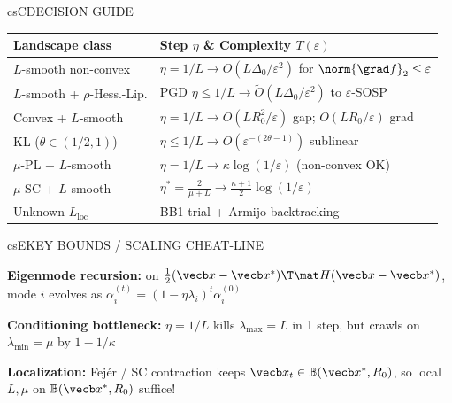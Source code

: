 \documentclass[../../../../master.tex]{subfiles}
\begin{document}
\begin{cscolumns}
\begin{cscard}{csC}{DECISION GUIDE}
  \renewcommand{\arraystretch}{1.12}\footnotesize
  \begin{tabular}{@{}>{\raggedright\arraybackslash}p{3.1cm}>{\raggedright\arraybackslash}p{4.6cm}@{}}
    \textbf{Landscape class} & \textbf{Step $\eta$ \& Complexity $T(\varepsilon)$}\\ \hline
    $L$-smooth non-convex & $\eta=1/L \to O(L\Delta_0/\varepsilon^2)$ for $\norm{\grad f}_2\le\varepsilon$\\
    $L$-smooth + $\rho$-Hess.-Lip. & PGD $\eta\le 1/L \to \tilde O(L\Delta_0/\varepsilon^2)$ to $\varepsilon$-SOSP\\
    Convex + $L$-smooth & $\eta=1/L \to O(LR_0^2/\varepsilon)$ gap; $O(LR_0/\varepsilon)$ grad\\
    KL ($\theta\in(1/2,1)$) & $\eta\le 1/L \to O(\varepsilon^{-(2\theta-1)})$ sublinear\\
    $\mu$-PL + $L$-smooth & $\eta=1/L \to \kappa\log(1/\varepsilon)$ (non-convex OK)\\
    $\mu$-SC + $L$-smooth & $\eta^*=\frac{2}{\mu+L} \to \frac{\kappa+1}{2}\log(1/\varepsilon)$\\
    Unknown $L_{\mathrm{loc}}$ & BB1 trial + Armijo backtracking\\
  \end{tabular}
\end{cscard}

\begin{cscard}{csE}{KEY BOUNDS / SCALING CHEAT-LINE}
  \footnotesize
  \begin{csbul}
    \item \textbf{Eigenmode recursion:} on $\frac{1}{2}(\vecb x-\vecb x^*)\T\mat H(\vecb x-\vecb x^*)$, mode $i$ evolves as $\alpha_i^{(t)}=(1-\eta\lambda_i)^t\alpha_i^{(0)}$
    \item \textbf{Conditioning bottleneck:} $\eta=1/L$ kills $\lambda_{\max}=L$ in 1 step, but crawls on $\lambda_{\min}=\mu$ by $1-1/\kappa$
    \item \textbf{Localization:} Fej\'er / SC contraction keeps $\vecb x_t\in\mathbb B(\vecb x^*,R_0)$, so local $L,\mu$ on $\mathbb B(\vecb x^*,R_0)$ suffice!
  \end{csbul}
\end{cscard}


\end{cscolumns}
\end{document}
